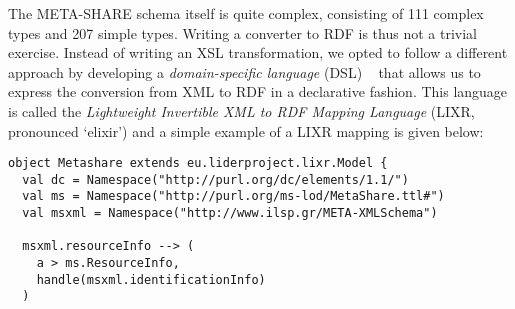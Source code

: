 \documentclass{llncs}
\begin{document}
{The META-SHARE schema itself is quite complex, consisting of 111 complex types
and 207 simple types. 
Writing a converter to RDF is thus not a trivial exercise. Instead of writing an
XSL transformation, we opted to follow a different approach by developing a
\emph{domain-specific language} (DSL) ~\cite{fowler2010domain} that allows us to express the conversion from XML to RDF in a declarative fashion.
This language is called the \textit{Lightweight Invertible XML to RDF Mapping
Language} (LIXR, pronounced `elixir') and a simple example of a
LIXR mapping is given below:
{\footnotesize
\begin{verbatim}
object Metashare extends eu.liderproject.lixr.Model {
  val dc = Namespace("http://purl.org/dc/elements/1.1/")
  val ms = Namespace("http://purl.org/ms-lod/MetaShare.ttl#")
  val msxml = Namespace("http://www.ilsp.gr/META-XMLSchema")

  msxml.resourceInfo --> (
    a > ms.ResourceInfo,
    handle(msxml.identificationInfo)
  )


\end{verbatim}}}
\end{document}
